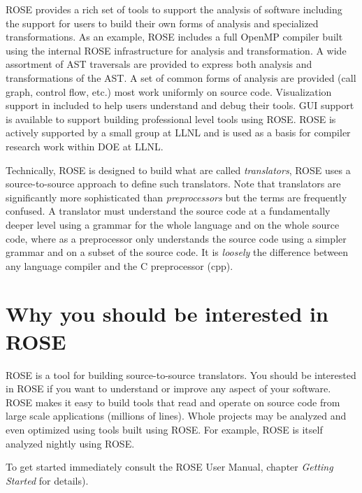    ROSE provides a rich set of tools to support the analysis of 
software including the support for users to build their own forms
of analysis and specialized transformations. As an example, ROSE includes
a full OpenMP compiler built using the internal ROSE infrastructure 
for analysis and transformation.
A wide assortment of AST traversals are provided
to express both analysis and transformations of the AST. A set of
common forms of analysis are provided (call graph, control flow, etc.)
most work uniformly on source code.
Visualization support in included to help users understand and debug
their tools.  GUI support is available to support building professional
level tools using ROSE. ROSE is actively supported by a small
group at LLNL and is used as a basis for compiler research work within 
DOE at LLNL.

   Technically, ROSE is designed to build what are called {\em translators}, 
ROSE uses a source-to-source approach to define such translators. Note that 
translators are significantly more sophisticated than {\em preprocessors} 
but the terms are frequently confused. A translator must understand the 
source code at a fundamentally deeper level using a grammar for the whole language
and on the whole source code, where as a preprocessor only understands the 
source code using a simpler grammar and on a subset of the source code. 
It is {\em loosely} the difference between any language compiler and the 
C preprocessor (cpp).

\section{Why you should be interested in ROSE}
ROSE is a tool for building source-to-source translators.
You should be interested in ROSE if you want to 
understand or improve any aspect of your software. ROSE
makes it easy to build tools that read and operate on source code
from large scale applications (millions of lines).  Whole projects
may be analyzed and even optimized using tools built using ROSE.
For example, ROSE is itself analyzed nightly using ROSE.

To get started immediately consult the ROSE User Manual, chapter
{\em Getting Started} for details).

